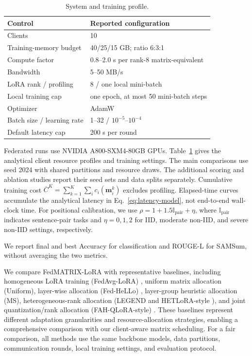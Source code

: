 \documentclass[10pt,conference,letterpaper]{IEEEtran}
\newcommand{\method}{FedMATRIX-LoRA}
\begin{document}
\begin{table}[t]
\centering
\caption{System and training profile.}
\label{tab:resource-profile}
\setlength{\tabcolsep}{3.6pt}
\begin{tabular}{@{}ll@{}}
\toprule
Control & Reported configuration \\
\midrule
Clients & 10 \\
Training-memory budget & 40/25/15 GB; ratio 6:3:1 \\
Compute factor & 0.8--2.0 s per rank-8 matrix-equivalent \\
Bandwidth & 5--50 MB/s \\
LoRA rank / profiling & 8 / one local mini-batch \\
Local training cap & one epoch, at most 50 mini-batch steps \\
Optimizer & AdamW \\
Batch size / learning rate & 1--32 / \(10^{-5}\)--\(10^{-4}\) \\
Default latency cap & 200 s per round \\
\bottomrule
\end{tabular}
\end{table}

Federated runs use NVIDIA A800-SXM4-80GB GPUs. Table~\ref{tab:resource-profile} gives the analytical client resource profiles and training settings. The main comparisons use seed 2024 with shared partitions and resource draws. The additional scoring and ablation studies report their seed sets and data splits separately. Cumulative training cost \(\overline C^K=\sum_{k=1}^{K}\sum_i c_i(\mathbf m_i^k)\) excludes profiling. Elapsed-time curves accumulate the analytical latency in Eq.~\eqref{eq:latency-model}, not end-to-end wall-clock time. For positional calibration, we use $\rho=1+1.5\mathbb I_{\mathrm{pair}}+\eta$, where $\mathbb I_{\mathrm{pair}}$ indicates sentence-pair tasks and $\eta=0,1,2$ for IID, moderate non-IID, and severe non-IID settings, respectively.





We report final and best Accuracy for classification and ROUGE-L for SAMSum, without averaging the two metrics.

We compare \method{} with representative baselines, including homogeneous LoRA training (FedAvg-LoRA) \cite{mcmahan2017communication,hu2022lora}, uniform matrix allocation (Uniform), layer-wise allocation (Fed-HeLLo) \cite{zhang2025fedhello}, layer-group heuristic allocation (MS), heterogeneous-rank allocation (LEGEND \cite{liu2025legend} and HETLoRA-style \cite{cho2024hetlora}), and joint quantization/rank allocation (FAH-QLoRA-style) \cite{gao2025fah}. These baselines represent different adaptation granularities and resource-allocation strategies, enabling a comprehensive comparison with our client-aware matrix scheduling. For a fair comparison, all methods use the same backbone models, data partitions, communication rounds, local training settings, and evaluation protocol.
\end{document}
